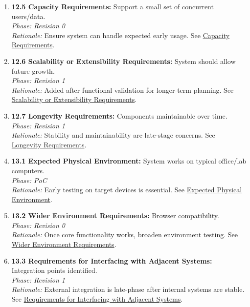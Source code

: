 \documentclass[11pt]{article}
\begin{document}
\begin{enumerate}
    \item \textbf{12.5 Capacity Requirements:} Support a small set of concurrent users/data.\\
    \textit{Phase: Revision 0} \\
    \textit{Rationale:} Ensure system can handle expected early usage. See \hyperref[subsec:capacity]{Capacity Requirements}.

    \item \textbf{12.6 Scalability or Extensibility Requirements:} System should allow future growth.\\
    \textit{Phase: Revision 1} \\
    \textit{Rationale:} Added after functional validation for longer-term planning. See \hyperref[subsec:scalability]{Scalability or Extensibility Requirements}.

    \item \textbf{12.7 Longevity Requirements:} Components maintainable over time.\\
    \textit{Phase: Revision 1} \\
    \textit{Rationale:} Stability and maintainability are late-stage concerns. See \hyperref[subsec:longevity]{Longevity Requirements}.

    \item \textbf{13.1 Expected Physical Environment:} System works on typical office/lab computers.\\
    \textit{Phase: PoC} \\
    \textit{Rationale:} Early testing on target devices is essential. See \hyperref[subsec:physical-env]{Expected Physical Environment}.

    \item \textbf{13.2 Wider Environment Requirements:} Browser compatibility.\\
    \textit{Phase: Revision 0} \\
    \textit{Rationale:} Once core functionality works, broaden environment testing. See \hyperref[subsec:wider-env]{Wider Environment Requirements}.

    \item \textbf{13.3 Requirements for Interfacing with Adjacent Systems:} Integration points identified.\\
    \textit{Phase: Revision 1} \\
    \textit{Rationale:} External integration is late-phase after internal systems are stable. See \hyperref[subsec:adjacent-systems]{Requirements for Interfacing with Adjacent Systems}.


\end{enumerate}
\end{document}
